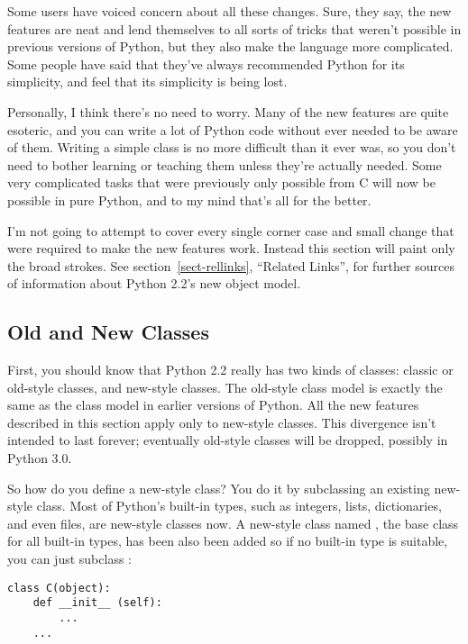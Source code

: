 \documentclass{howto}
\begin{document}
Some users have voiced concern about all these changes.  Sure, they
say, the new features are neat and lend themselves to all sorts of
tricks that weren't possible in previous versions of Python, but
they also make the language more complicated.  Some people have said
that they've always recommended Python for its simplicity, and feel
that its simplicity is being lost.

Personally, I think there's no need to worry.  Many of the new
features are quite esoteric, and you can write a lot of Python code
without ever needed to be aware of them.  Writing a simple class is no
more difficult than it ever was, so you don't need to bother learning
or teaching them unless they're actually needed.  Some very
complicated tasks that were previously only possible from C will now
be possible in pure Python, and to my mind that's all for the better.

I'm not going to attempt to cover every single corner case and small
change that were required to make the new features work.  Instead this
section will paint only the broad strokes.  See section~\ref{sect-rellinks},
``Related Links'', for further sources of information about Python 2.2's new
object model.


\subsection{Old and New Classes}

First, you should know that Python 2.2 really has two kinds of
classes: classic or old-style classes, and new-style classes.  The
old-style class model is exactly the same as the class model in
earlier versions of Python.  All the new features described in this
section apply only to new-style classes. This divergence isn't
intended to last forever; eventually old-style classes will be
dropped, possibly in Python 3.0.

So how do you define a new-style class?  You do it by subclassing an
existing new-style class.  Most of Python's built-in types, such as
integers, lists, dictionaries, and even files, are new-style classes
now.  A new-style class named , the base class for all
built-in types, has been also been added so if no built-in type is
suitable, you can just subclass :

\begin{verbatim}
class C(object):
    def __init__ (self):
        ...
    ...
\end{verbatim}
\end{document}
